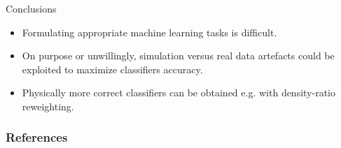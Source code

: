 \documentclass{beamer}
\begin{document}
\begin{frame}{Conclusions}

\begin{itemize}
    \item Formulating appropriate machine learning tasks is {\color{red} difficult}.

    \vspace{0.5cm}

    \item On purpose or {\color{red} unwillingly}, simulation versus real data artefacts
          could be exploited to maximize classifiers accuracy.

    \vspace{0.5cm}

    \item Physically more correct classifiers can be obtained e.g. with {\color{blue} density-ratio reweighting}.
\end{itemize}

\end{frame}


\begin{frame}
    \frametitle{References}
    {\footnotesize
    
    }
\end{frame}
\end{document}
